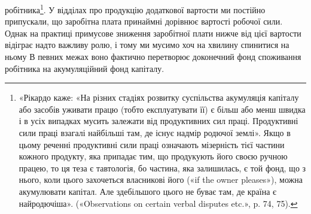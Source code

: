 \parcont{}  %
робітника\footnote{
«Рікардо каже: «На різних стадіях розвитку суспільства акумуляція
капіталу або засобів уживати працю (тобто експлуатувати її)
є більш або менш швидка і в усіх випадках мусить залежати від продуктивних
сил праці. Продуктивні сили праці взагалі найбільші там, де
існує надмір родючої землі». Якщо в цьому реченні продуктивні сили
праці означають мізерність тієї частини кожного продукту, яка припадає
тим, що продукують його своєю ручною працею, то ця теза є тавтологія,
бо частина, яка залишилась, є той фонд, що з нього, коли цього захочеться
власникові його («if the owner pleases»), можна акумулювати капітал.
Але здебільшого цього не буває там, де країна є найродючіша».
(«Observations on certain verbal disputes etc.», p. 74, 75).
}. У відділах про продукцію додаткової вартости ми
постійно припускали, що заробітна плата принаймні дорівнює
вартості робочої сили. Однак на практиці примусове зниження
заробітної плати нижче від цієї вартости відіграє надто важливу
ролю, і тому ми мусимо хоч на хвилину спинитися на ньому
В певних межах воно фактично перетворює доконечний фонд
споживання робітника на акумуляційний фонд капіталу.

